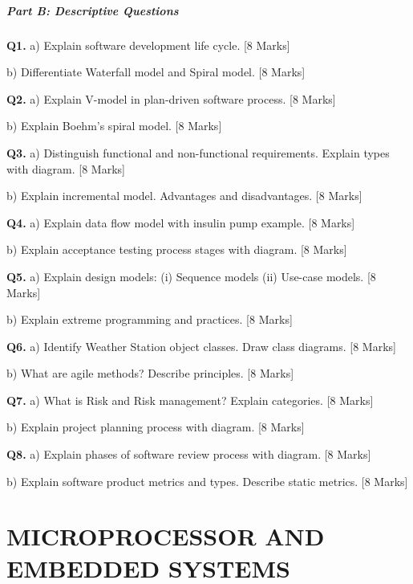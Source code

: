 \documentclass[11pt,a4paper]{article}
\begin{document}
\subsubsection*{Part B: Descriptive Questions}

\textbf{Q1.} a) Explain software development life cycle. \hfill [8 Marks]

b) Differentiate Waterfall model and Spiral model. \hfill [8 Marks]

\textbf{Q2.} a) Explain V-model in plan-driven software process. \hfill [8 Marks]

b) Explain Boehm's spiral model. \hfill [8 Marks]

\textbf{Q3.} a) Distinguish functional and non-functional requirements. Explain types with diagram. \hfill [8 Marks]

b) Explain incremental model. Advantages and disadvantages. \hfill [8 Marks]

\textbf{Q4.} a) Explain data flow model with insulin pump example. \hfill [8 Marks]

b) Explain acceptance testing process stages with diagram. \hfill [8 Marks]

\textbf{Q5.} a) Explain design models: (i) Sequence models (ii) Use-case models. \hfill [8 Marks]

b) Explain extreme programming and practices. \hfill [8 Marks]

\textbf{Q6.} a) Identify Weather Station object classes. Draw class diagrams. \hfill [8 Marks]

b) What are agile methods? Describe principles. \hfill [8 Marks]

\textbf{Q7.} a) What is Risk and Risk management? Explain categories. \hfill [8 Marks]

b) Explain project planning process with diagram. \hfill [8 Marks]

\textbf{Q8.} a) Explain phases of software review process with diagram. \hfill [8 Marks]

b) Explain software product metrics and types. Describe static metrics. \hfill [8 Marks]

\newpage
\part{MICROPROCESSOR AND EMBEDDED SYSTEMS}
\end{document}
